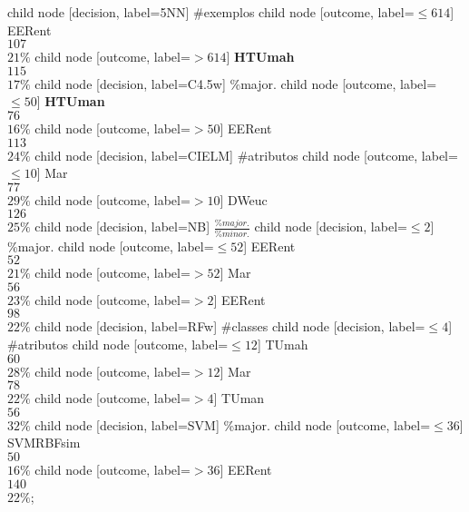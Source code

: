 child {node [decision, label=5NN] {\#exemplos}
child {node [outcome, label=$\leq614$] {EERent \\$107$\\$21\%$}}
child {node [outcome, label=$>614$] {\textbf{HTUmah} \\$115$\\$17\%$}}}
child {node [decision, label=C4.5w] {\%major.}
child {node [outcome, label=$\leq50$] {\textbf{HTUman} \\$76$\\$16\%$}}
child {node [outcome, label=$>50$] {EERent \\$113$\\$24\%$}}}
child {node [decision, label=CIELM] {\#atributos}
child {node [outcome, label=$\leq10$] {Mar \\$77$\\$29\%$}}
child {node [outcome, label=$>10$] {DWeuc \\$126$\\$25\%$}}}
child {node [decision, label=NB] {$\frac{\%major.}{\%minor.}$}
child {node [decision, label=$\leq2$] {\%major.}
child {node [outcome, label=$\leq52$] {EERent \\$52$\\$21\%$}}
child {node [outcome, label=$>52$] {Mar \\$56$\\$23\%$}}}
child {node [outcome, label=$>2$] {EERent \\$98$\\$22\%$}}}
child {node [decision, label=RFw] {\#classes}
child {node [decision, label=$\leq4$] {\#atributos}
child {node [outcome, label=$\leq12$] {TUmah \\$60$\\$28\%$}}
child {node [outcome, label=$>12$] {Mar \\$78$\\$22\%$}}}
child {node [outcome, label=$>4$] {TUman \\$56$\\$32\%$}}}
child {node [decision, label=SVM] {\%major.}
child {node [outcome, label=$\leq36$] {SVMRBFsim \\$50$\\$16\%$}}
child {node [outcome, label=$>36$] {EERent \\$140$\\$22\%$}}};